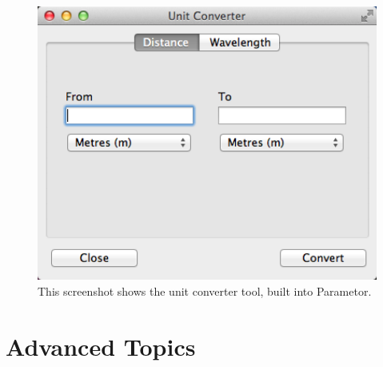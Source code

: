 \documentclass[a4paper,10pt]{article}
\begin{document}
\begin{figure}
\centering
\includegraphics[width=12.5cm]{img/tool-unit-converter.png}
\caption{This screenshot shows the unit converter tool, built into Parametor.}
\label{fig:tool-unit-converter}
\end{figure}

\section{Advanced Topics}
\end{document}
